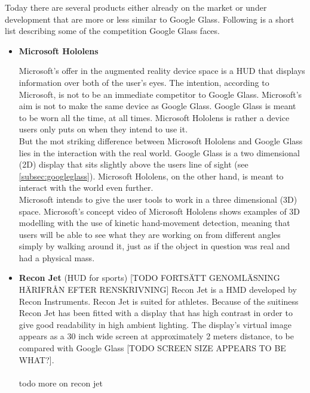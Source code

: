 Today there are several products either already on the market or under development that are more or less similar to Google Glass. Following is a short list describing some of the competition Google Glass faces.

\begin{itemize}
\item \textbf{Microsoft Hololens}

Microsoft's offer in the augmented reality device space is a HUD that displays information over both of the user's eyes.\cite{hololens} The intention, according to Microsoft, is not to be an immediate competitor to Google Glass. Microsoft's aim is not to make the same device as Google Glass. Google Glass is meant to be worn all the time, at all times. Microsoft Hololens is rather a device users only puts on when they intend to use it.\\

But the mot striking difference between Microsoft Hololens and Google Glass lies in the interaction with the real world. Google Glass is a two dimensional (2D) display that sits slightly above the users line of sight (see \ref{subsec:googleglass}). Microsoft Hololens, on the other hand, is meant to interact with the world even further. \\

Microsoft intends to give the user tools to work in a three dimensional (3D) space. Microsoft's concept video\cite{hololensConceptVideo} of Microsoft Hololens shows examples of 3D modelling with the use of kinetic hand-movement detection, meaning that users will be able to see what they are working on from different angles simply by walking around it, just as if the object in question was real and had a physical mass.\\

\item \textbf{Recon Jet}\cite{reconJet} (HUD for sports)
[TODO FORTSÄTT GENOMLÄSNING HÄRIFRÅN EFTER RENSKRIVNING]
Recon Jet is a HMD developed by Recon Instruments. Recon Jet is suited for athletes. Because of the suitiness Recon Jet has been fitted with a display that has high contrast in order to give good readability in high ambient lighting. The display's virtual image appears as  a 30 inch wide screen at approximately 2 meters distance, to be compared with Google Glass [TODO SCREEN SIZE APPEARS TO BE WHAT?].\cite{reconJetSpecs}
\\
\\
todo more on recon jet\\


\end{itemize}
